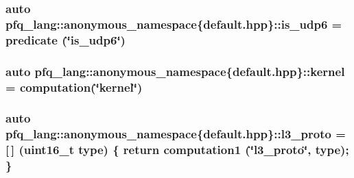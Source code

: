 \hypertarget{namespacepfq__lang_1_1anonymous__namespace_02default_8hpp_03_a31e93829d19f72f4aece81f57d7cef9c}{
\subsubsection[{is\-\_\-udp6}]{\setlength{\rightskip}{0pt plus 5cm}auto pfq\-\_\-lang\-::anonymous\-\_\-namespace\{default.\-hpp\}\-::is\-\_\-udp6 = {\bf predicate} (\char`\"{}is\-\_\-udp6\char`\"{})}}\label{namespacepfq__lang_1_1anonymous__namespace_02default_8hpp_03_a31e93829d19f72f4aece81f57d7cef9c}
\hypertarget{namespacepfq__lang_1_1anonymous__namespace_02default_8hpp_03_a68a2502f951a2b671a7d0496609f5d2a}{
\subsubsection[{kernel}]{\setlength{\rightskip}{0pt plus 5cm}auto pfq\-\_\-lang\-::anonymous\-\_\-namespace\{default.\-hpp\}\-::kernel = {\bf computation}(\char`\"{}kernel\char`\"{})}}\label{namespacepfq__lang_1_1anonymous__namespace_02default_8hpp_03_a68a2502f951a2b671a7d0496609f5d2a}
\hypertarget{namespacepfq__lang_1_1anonymous__namespace_02default_8hpp_03_aed01dd5380a873d92397ec0d4c07abac}{
\subsubsection[{l3\-\_\-proto}]{\setlength{\rightskip}{0pt plus 5cm}auto pfq\-\_\-lang\-::anonymous\-\_\-namespace\{default.\-hpp\}\-::l3\-\_\-proto = \mbox{[}$\,$\mbox{]} (uint16\-\_\-t type) \{ return {\bf computation1} (\char`\"{}l3\-\_\-proto\char`\"{}, type); \}}}\label{namespacepfq__lang_1_1anonymous__namespace_02default_8hpp_03_aed01dd5380a873d92397ec0d4c07abac}
